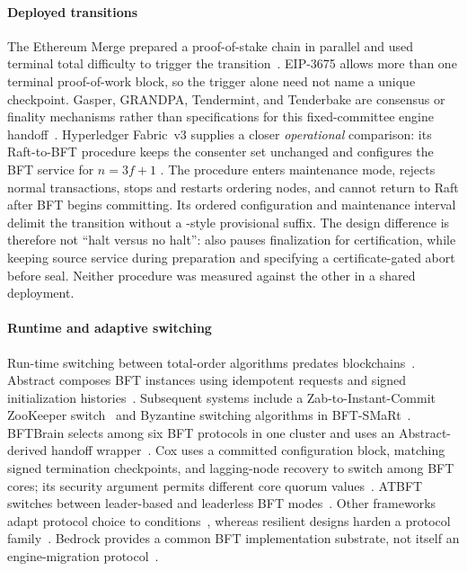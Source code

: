 \paragraph{Deployed transitions}
The Ethereum Merge prepared a proof-of-stake chain in parallel and used terminal total difficulty
to trigger the transition~\cite{ethereummerge,eip3675}. EIP-3675 allows more than one terminal
proof-of-work block, so the trigger alone need not name a unique checkpoint. Gasper, GRANDPA,
Tendermint, and Tenderbake are consensus or finality mechanisms rather than specifications for
this fixed-committee engine handoff~\cite{gasper,grandpa,tendermint,tenderbake}.
Hyperledger Fabric~v3 supplies a closer \emph{operational} comparison: its Raft-to-BFT procedure
keeps the consenter set unchanged and configures the BFT service for $n=3f+1$
\cite{fabricbftmigration}. The procedure enters maintenance mode, rejects normal transactions,
stops and restarts ordering nodes, and cannot return to Raft after BFT begins committing. Its
ordered configuration and maintenance interval delimit the transition without a
\sage{}-style provisional suffix. The design difference is therefore not ``halt versus no halt'':
\sage{} also pauses finalization for certification, while keeping source service during preparation
and specifying a certificate-gated abort before seal. Neither procedure was measured against the
other in a shared deployment.

\paragraph{Runtime and adaptive switching}
Run-time switching between total-order algorithms predates blockchains~\cite{runtimeorder}.
Abstract composes BFT instances using idempotent requests and signed initialization
histories~\cite{abstracteurosys,abstract}. Subsequent systems include a Zab-to-Instant-Commit
ZooKeeper switch~\cite{zkswitch} and Byzantine switching algorithms in
BFT-SMaRt~\cite{dynamicbft}. BFTBrain selects among six BFT protocols in one cluster and uses an
Abstract-derived handoff wrapper~\cite{bftbrain}. Cox uses a committed configuration block,
matching signed termination checkpoints, and lagging-node recovery to switch among BFT cores;
its security argument permits different core quorum values~\cite{cox}. ATBFT switches between
leader-based and leaderless BFT modes~\cite{atbft}. Other frameworks adapt protocol choice to
conditions~\cite{spectrum,adapt,aware,dapbft,adachain,adaptbft,threatadapt,adacon}, whereas
resilient designs harden a protocol family~\cite{rebft,prime,aardvark,rbft}. Bedrock provides
a common BFT implementation substrate, not itself an engine-migration protocol~\cite{bedrock}.

